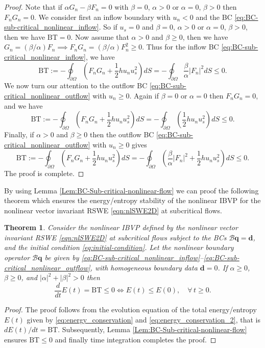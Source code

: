 \documentclass{article}
\numberwithin{equation}{section}
\newtheorem{theorem}{Theorem}
\theoremstyle{definition}
\begin{document}
\begin{proof}
Note that if  $\alpha G_n - \beta F_n=0$ with $\beta=0$, $\alpha>0$ or $\alpha =0$, $\beta>0$ then $F_nG_n=0$. 
We consider first an inflow boundary with $u_n<0$ and the BC \eqref{eq:BC-sub-critical_nonlinear_inflow}. So if $u_s =0$ and $\beta=0$, $\alpha>0$ or $\alpha =0$, $\beta>0$, then we have $\mathrm{BT}=0$.
Now assume that $\alpha>0$ and $\beta \ge 0$, then we have $G_n = (\beta/\alpha) F_n \implies F_nG_n = (\beta/\alpha) F_n^2 \ge 0$. Thus for the inflow BC \eqref{eq:BC-sub-critical_nonlinear_inflow}, we have 
$$
\mathrm{BT}:= -\oint_{\partial \Omega} \left(F_nG_n + \frac{1}{2} hu_n u_s^2\right) dS=  -\oint_{\partial \Omega} \frac{\beta}{\alpha} |F_n|^2 dS\le 0.
$$
We now turn our attention to the outflow BC \eqref{eq:BC-sub-critical_nonlinear_outflow} with $u_n\ge 0$.
Again if $\beta=0$ or $\alpha =0$ then $F_nG_n=0$, and we have 
$$
\mathrm{BT}:= -\oint_{\partial \Omega} \left(F_nG_n + \frac{1}{2} hu_n u_s^2\right) dS=  -\oint_{\partial \Omega}\left(\frac{1}{2} hu_n u_s^2\right)dS\le 0.
$$
Finally, if $\alpha>0$ and $\beta \ge 0$ then  the outflow BC \eqref{eq:BC-sub-critical_nonlinear_outflow} with $u_n \ge 0$ gives
$$
\mathrm{BT}:= -\oint_{\partial \Omega} \left(F_nG_n + \frac{1}{2} hu_n u_s^2\right) dS=  -\oint_{\partial \Omega}\left( \frac{\beta}{\alpha} |F_n|^2 + \frac{1}{2} hu_n u_s^2\right)dS\le 0.
$$
The proof is complete.
\end{proof}
By using Lemma \ref{Lem:BC-Sub-critical-nonlinear-flow} we can proof the following theorem which ensures the energy/entropy stability of the nonlinear IBVP for the nonlinear vector invariant RSWE \eqref{eqn:nlSWE2D} at subcritical flows.
\begin{theorem}\label{theo:energy-stability-nonlinear-ibvp}
Consider the nonlinear IBVP defined by the nonlinear vector invariant RSWE \eqref{eqn:nlSWE2D} at subcritical flows subject to the BCs $\mathcal{B}\mathbf{q}=\mathbf{d}$,  and the initial condition \eqref{eq:initial-condition}. Let the nonlinear boundary operator  $\mathcal{B}\mathbf{q} $ be given by \eqref{eq:BC-sub-critical_nonlinear_inflow}--\eqref{eq:BC-sub-critical_nonlinear_outflow}, with homogeneous boundary data $\mathbf{d} =0$. If  $\alpha\ge 0$, $\beta\ge0$, and $|\alpha|^2 + |\beta|^2 >0$  then 
$$
\frac{d}{dt}E(t) =\mathrm{BT} \le 0 \iff E(t) \le E(0), \quad \forall\, t\ge0.
$$
\end{theorem}
\begin{proof}
    The proof follows from the evolution equation of the total energy/entropy $E(t)$ given by \eqref{eq:energy_conservation}  and \eqref{eq:energy_conservation_2}, that is $dE(t)/dt = \mathrm{BT}$. Subsequently, Lemma \ref{Lem:BC-Sub-critical-nonlinear-flow} ensures $\mathrm{BT} \le 0$ and finally time integration completes the proof.   
\end{proof}
\end{document}
